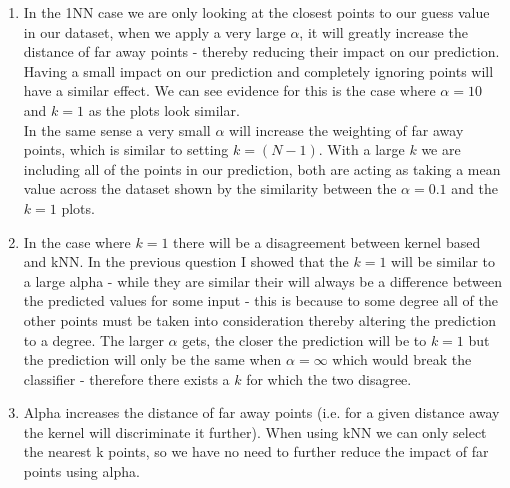 \documentclass[submit]{harvardml}
\begin{document}
\begin{enumerate}
\begin{enumerate}
    \end{enumerate}
    \item 
        In the 1NN case we are only looking at the closest points to our guess value in our dataset, when we apply a very large $\alpha$, it will greatly increase the distance of far away points - thereby reducing their impact on our prediction. Having a small impact on our prediction and completely ignoring points will have a similar effect. We can see evidence for this is the case where $\alpha = 10$ and $k=1$ as the plots look similar.\\
        In the same sense a very small $\alpha$ will increase the weighting of far away points, which is similar to setting $k=(N-1)$. With a large $k$ we are including all of the points in our prediction, both are acting as taking a mean value across the dataset shown by the similarity between the $\alpha = 0.1$ and the $k=1$ plots.
    
    \item In the case where $k=1$ there will be a disagreement between kernel based and kNN. In the previous question I showed that the $k=1$ will be similar to a large alpha - while they are similar their will always be a difference between the predicted values for some input - this is because to some degree all of the other points must be taken into consideration thereby altering the prediction to a degree. The larger $\alpha$ gets, the closer the prediction will be to $k=1$ but the prediction will only be the same when $\alpha = \infty$ which would break the classifier - therefore there exists a $k$ for which the two disagree.
    
    \item Alpha increases the distance of far away points (i.e. for a given distance away the kernel will discriminate it further). When using kNN we can only select the nearest k points, so we have no need to further reduce the impact of far points using alpha.

\end{enumerate}
\newpage

\end{document}
